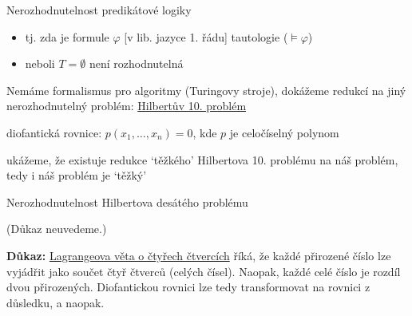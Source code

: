 \documentclass{beamer}
\begin{document}
\begin{frame}{Nerozhodnutelnost predikátové logiky}
    

    \begin{itemize}
        \item tj. zda je formule $\varphi$ [v lib. jazyce 1. řádu] tautologie ($\models\varphi$)
        \item neboli $T=\emptyset$ není rozhodnutelná 
    \end{itemize}

    Nemáme formalismus pro algoritmy (Turingovy stroje), dokážeme redukcí na jiný nerozhodnutelný problém: \alert{\href{https://en.wikipedia.org/wiki/Hilbert\%27s_problems}{Hilbertův 10. problém}}

    \bigskip


    \medskip

    \alert{diofantická rovnice}: $p(x_1,\dots,x_n)=0$, kde $p$ je celočíselný polynom


    ukážeme, že existuje \alert{redukce} `těžkého' Hilbertova 10. problému na náš problém, tedy i náš problém je `těžký'
    
\end{frame}


\begin{frame}{Nerozhodnutelnost Hilbertova desátého problému}


    (Důkaz neuvedeme.)

    \medskip

    
    \textbf{Důkaz:} \alert{\href{https://en.wikipedia.org/wiki/Lagrange\%27s_four-square_theorem}{Lagrangeova věta o čtyřech čtvercích}} říká, že každé přirozené číslo lze vyjádřit jako součet čtyř čtverců (celých čísel). Naopak, každé celé číslo je rozdíl dvou přirozených. Diofantickou rovnici lze tedy transformovat na rovnici z důsledku, a naopak.\hfill\qedsymbol

\end{frame}
\end{document}
